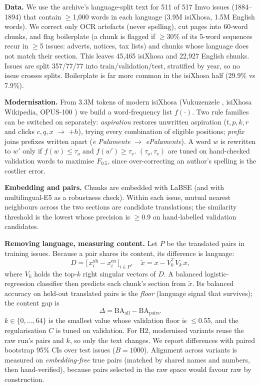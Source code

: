 \documentclass[10pt,twocolumn]{article}
\makeatletter
\newcommand{\BA}{\mathrm{BA}}
\renewcommand\section{\@startsection{section}{1}{\z@}{-5pt plus -1pt}{2pt}{\normalfont\large\bfseries}}
\makeatother
\begin{document}
\section{Method}
\textbf{Data.} We use the archive's language-split text for 511 of 517 Imvo issues (1884--1894) that
contain $\geq$1{,}000 words in each language (3.9M isiXhosa, 1.5M English words). We correct only OCR
artefacts (never spelling), cut pages into 60-word chunks, and flag boilerplate (a chunk is flagged if
$\geq$30\% of its 5-word sequences recur in $\geq$5 issues: adverts, notices, tax lists) and chunks whose
language does not match their section. This leaves 45{,}465 isiXhosa and 22{,}927 English chunks.
Issues are split 357/77/77 into train/validation/test, stratified by year, so no issue crosses splits.
Boilerplate is far more common in the isiXhosa half (29.9\% vs 7.9\%).

\textbf{Modernisation.} From 3.3M tokens of modern isiXhosa (Vukuzenzele \citep{vuk}, isiXhosa
Wikipedia, OPUS-100 \citep{opus}) we build a word-frequency list $f(\cdot)$. Two rule families can be
switched on separately: \emph{aspiration} restores unwritten aspiration ($t,p,k,r$ and clicks $c,q,x$
$\to$ $+h$), trying every combination of eligible positions; \emph{prefix} joins prefixes written apart
(\emph{e Palamente} $\to$ \emph{ePalamente}). A word $w$ is rewritten to $w'$ only if
$f(w)\le\tau_o$ and $f(w')\ge\tau_v$. $(\tau_o,\tau_v)$ are tuned on hand-checked validation words to
maximise $F_{0.5}$, since over-correcting an author's spelling is the costlier error.

\textbf{Embedding and pairs.} Chunks are embedded with LaBSE \citep{labse} (and with multilingual-E5
\citep{e5} as a robustness check). Within each issue, mutual nearest neighbours across the two sections
are candidate translations; the similarity threshold is the lowest whose precision is $\ge$0.9 on
hand-labelled validation candidates.

\textbf{Removing language, measuring content.} Let $P$ be the translated pairs in training issues.
Because a pair shares its content, its difference is language:
\begin{equation}
D=\big[\,x^{\mathrm{xh}}_i-x^{\mathrm{en}}_i\,\big]_{i\in P},\quad
\tilde{x}=x-V_k^{\top}V_k\,x,
\end{equation}
where $V_k$ holds the top-$k$ right singular vectors of $D$. A balanced logistic-regression classifier
then predicts each chunk's section from $\tilde{x}$. Its balanced accuracy on held-out translated pairs
is the \emph{floor} (language signal that survives); the content gap is
\begin{equation}
\Delta=\BA_{\mathrm{all}}-\BA_{\mathrm{pairs}}.
\end{equation}
$k\in\{0,\dots,64\}$ is the smallest value whose validation floor is $\le$0.55, and the regularisation
$C$ is tuned on validation. For H2, modernised variants reuse the raw run's pairs and $k$, so only the
text changes. We report differences with paired bootstrap 95\% CIs over test issues ($B{=}1000$).
Alignment across variants is measured on \emph{embedding-free} true pairs (matched by shared names and
numbers, then hand-verified), because pairs selected in the raw space would favour raw by construction.
\end{document}
